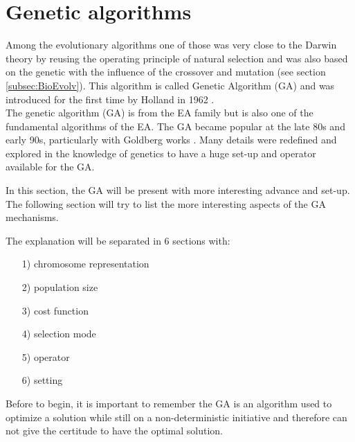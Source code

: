 \section{Genetic algorithms} \label{sec:GAdetail}
Among the evolutionary algorithms one of those was very close to the Darwin theory by reusing the operating principle of natural selection and was also based on the genetic with the influence of the crossover and mutation (see section \ref{subsec:BioEvolv}). This algorithm is called Genetic Algorithm (GA) and was introduced for the first time by Holland in 1962 \citep{111*holland1962}. \\
The genetic algorithm (GA) is from the EA family but is also one of the fundamental algorithms of the EA.
The GA became popular at the late 80s and early 90s, particularly with Goldberg works \cite{112*goldberg1989}. Many details were redefined and explored in the knowledge of genetics to have a huge set-up and operator available for the GA.


   

In this section, the GA will be present with more interesting advance and set-up. 
The following section will try to list the more interesting aspects of the GA mechanisms. 

 
 The explanation will be separated in 6 sections with:
\begin{itemize}
\item [1)] 	chromosome representation 
\item [2)]	population size 
\item [3)]	cost function 
\item [4)]	selection mode 
\item [5)]	operator 
\item [6)]	setting 

\end{itemize} 

Before to begin, it is important to remember the GA is an algorithm used to optimize a solution while still on a non-deterministic initiative and therefore can not give the certitude to have the optimal solution. 

